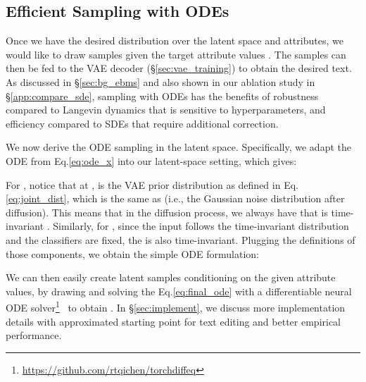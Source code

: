 \documentclass[11pt]{article}
\begin{document}
\subsection{Efficient Sampling with ODEs}
\label{sec:ode_sampler}
Once we have the desired distribution  over the latent space and attributes, we would like to draw samples  given the target attribute values . The samples can then be fed to the VAE decoder (\S\ref{sec:vae_training}) to obtain the desired text. As discussed in \S\ref{sec:bg_ebms} and also shown in our ablation study in \S\ref{app:compare_sde}, sampling with ODEs has the benefits of robustness compared to Langevin dynamics that is sensitive to hyperparameters, and efficiency compared to SDEs that require additional correction. 

We now derive the ODE sampling in the latent space. Specifically, we adapt the ODE from Eq.\eqref{eq:ode_x} into our latent-space setting, which gives:

For , notice that at ,  is the VAE prior distribution  as defined in Eq.\eqref{eq:joint_dist}, which is the same as  (i.e., the Gaussian noise distribution after diffusion). This means that in the diffusion process, we always have  that is time-invariant \citep{nie2021controllable}. Similarly, for , since the input  follows the time-invariant distribution and the classifiers  are fixed, the  is also time-invariant. Plugging the definitions of those components, we obtain the simple ODE formulation:

We can then easily create latent samples conditioning on the given attribute values, by drawing  and solving the Eq.\eqref{eq:final_ode} with a differentiable neural ODE solver\footnote{\url{https://github.com/rtqichen/torchdiffeq}}~\cite{chen2018neuralode,chen2021eventfn} to obtain . In \S\ref{sec:implement}, we discuss more implementation details with approximated starting point  for text editing and better empirical performance.
\end{document}
